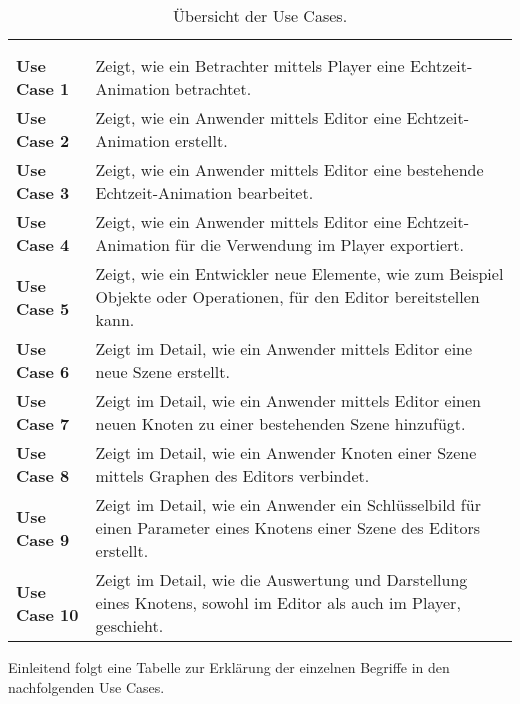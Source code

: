\begin{longtabu}{p{0.2\textwidth}p{0.8\textwidth}}
    \centering\\
    \caption{Übersicht der Use Cases.}\label{table:uc-explanation}\\
    \toprule
        \textbf{Use Case 1} &
        Zeigt, wie ein Betrachter mittels Player eine Echtzeit-Animation
        betrachtet.\\
    \cmidrule(r){1-1}\cmidrule(lr){2-2}
        \textbf{Use Case 2} &
        Zeigt, wie ein Anwender mittels Editor eine Echtzeit-Animation
        erstellt.\\
    \cmidrule(r){1-1}\cmidrule(lr){2-2}
        \textbf{Use Case 3} &
        Zeigt, wie ein Anwender mittels Editor eine bestehende Echtzeit-Animation
        bearbeitet.\\
    \cmidrule(r){1-1}\cmidrule(lr){2-2}
        \textbf{Use Case 4} &
        Zeigt, wie ein Anwender mittels Editor eine Echtzeit-Animation
        für die Verwendung im Player exportiert.\\
    \cmidrule(r){1-1}\cmidrule(lr){2-2}
        \textbf{Use Case 5} &
        Zeigt, wie ein Entwickler neue Elemente, wie zum Beispiel Objekte oder
        Operationen, für den Editor bereitstellen kann.\\
    \cmidrule(r){1-1}\cmidrule(lr){2-2}
        \textbf{Use Case 6} &
        Zeigt im Detail, wie ein Anwender mittels Editor eine neue Szene
        erstellt.\\
    \cmidrule(r){1-1}\cmidrule(lr){2-2}
        \textbf{Use Case 7} &
        Zeigt im Detail, wie ein Anwender mittels Editor einen neuen Knoten zu
        einer bestehenden Szene hinzufügt.\\
    \cmidrule(r){1-1}\cmidrule(lr){2-2}
        \textbf{Use Case 8} &
        Zeigt im Detail, wie ein Anwender Knoten einer Szene mittels Graphen
        des Editors verbindet.\\
    \cmidrule(r){1-1}\cmidrule(lr){2-2}
        \textbf{Use Case 9} &
        Zeigt im Detail, wie ein Anwender ein Schlüsselbild für einen Parameter
        eines Knotens einer Szene des Editors erstellt.\\
    \cmidrule(r){1-1}\cmidrule(lr){2-2}
        \textbf{Use Case 10} &
        Zeigt im Detail, wie die Auswertung und Darstellung eines Knotens,
        sowohl im Editor als auch im Player, geschieht.\\
    \bottomrule
\end{longtabu}

Einleitend folgt eine Tabelle zur Erklärung der einzelnen Begriffe in den
nachfolgenden Use Cases.












